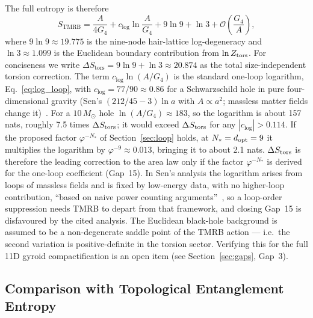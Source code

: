 \documentclass[11pt,a4paper]{article}
\begin{document}
The full entropy is therefore
\begin{equation}
  \boxed{S_{\mathrm{TMRB}} = \frac{A}{4G_4} + c_{\log}\ln\frac{A}{G_4} + 9\ln 9 + \ln 3
    + \mathcal{O}\!\left(\frac{G_4}{A}\right),}
  \label{eq:S_TMRB}
\end{equation}
where $9\ln 9 \approx 19.775$ is the nine-node hair-lattice log-degeneracy and
$\ln 3 \approx 1.099$ is the Euclidean boundary contribution from $\ln Z_{\rm tors}$.
For conciseness we write $\Delta S_{\mathrm{tors}} = 9\ln 9 + \ln 3 \approx 20.874$
as the total size-independent torsion correction.  The term
$c_{\log}\ln(A/G_4)$ is the standard one-loop logarithm, Eq.~\eqref{eq:log_loop},
with $c_{\log} = 77/90 \approx 0.86$ for a Schwarzschild hole in pure four-dimensional
gravity (Sen's $(212/45 - 3)\ln a$ with $A \propto a^2$; massless matter fields change
it)~\cite{Sen2012}. For a $10\,M_\odot$ hole $\ln(A/G_4) \approx 183$, so the logarithm
is about 157 nats, roughly 7.5 times $\Delta S_{\rm tors}$; it would exceed
$\Delta S_{\rm tors}$ for any $|c_{\log}| > 0.114$.
If the proposed factor $\varphi^{-N_*}$ of Section~\ref{sec:loop} holds, at
$N_* = d_{\rm opt} = 9$ it multiplies the logarithm by $\varphi^{-9} \approx 0.013$,
bringing it to about 2.1 nats. $\Delta S_{\rm tors}$ is therefore the
leading correction to the area law only if the factor $\varphi^{-N_*}$ is derived for the one-loop coefficient (Gap~15).
In Sen's analysis the logarithm arises from loops of massless fields and is
fixed by low-energy data, with no higher-loop contribution, ``based on naive power counting arguments''~\cite{Sen2012},
so a loop-order suppression needs TMRB to depart from that framework, and closing Gap~15 is disfavoured by the cited analysis.
The Euclidean black-hole
background is assumed to be a non-degenerate saddle point of the TMRB action — i.e.\ the
second variation is positive-definite in the torsion sector.  Verifying this
for the full 11D gyroid compactification is an open item (see
Section~\ref{sec:gaps}, Gap~3).

\subsection{Comparison with Topological Entanglement Entropy}
\end{document}
